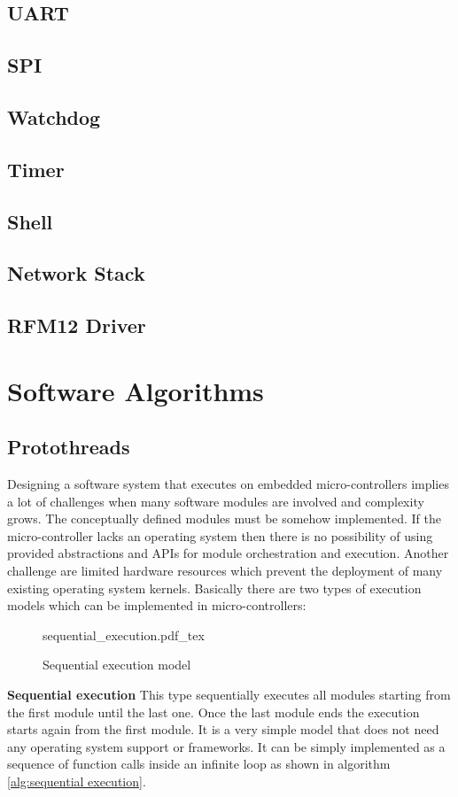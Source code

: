 \section{UART}
\section{SPI}
\section{Watchdog}
\section{Timer}
\section{Shell}
\section{Network Stack}
\section{RFM12 Driver}

\chapter{Software Algorithms}
\section{Protothreads}
Designing a software system that executes on embedded micro-controllers implies a lot of challenges when many software modules are involved and complexity grows. The conceptually defined modules must be somehow implemented. If the micro-controller lacks an operating system then there is no possibility of using provided abstractions and APIs for module orchestration and execution. Another challenge are limited hardware resources which prevent the deployment of many existing operating system kernels. Basically there are two types of execution models which can be implemented in micro-controllers:

\begin{figure}[H]
    \centering
    {sequential_execution.pdf_tex}
    \caption{Sequential execution model}
\end{figure}

\textbf{Sequential execution}
This type sequentially executes all modules starting from the first module until the last one. Once the last module ends the execution starts again from the first module. It is a very simple model that does not need any operating system support or frameworks. It can be simply implemented as a sequence of function calls inside an infinite loop as shown in algorithm \ref{alg:sequential execution}.

